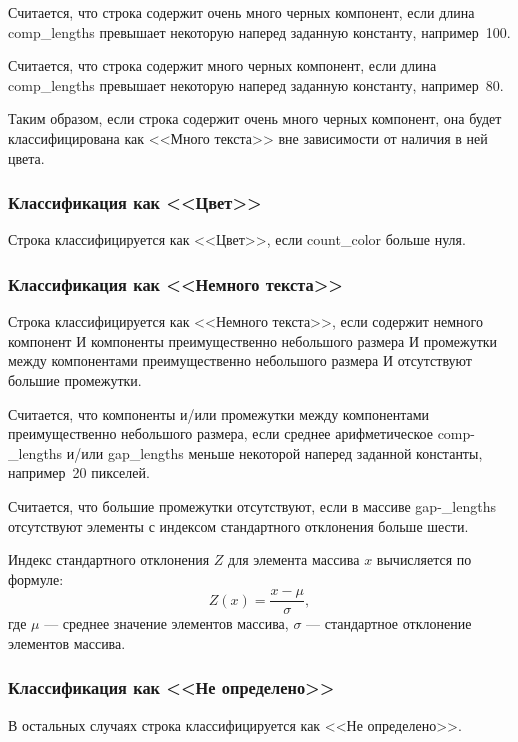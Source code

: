 Считается, что строка содержит очень много черных компонент, если длина comp\_lengths превышает некоторую наперед заданную константу, например~100.

Считается, что строка содержит много черных компонент, если длина comp\_lengths превышает некоторую наперед заданную константу, например~80.

Таким образом, если строка содержит очень много черных компонент, она будет классифицирована как <<Много текста>> вне зависимости от наличия в ней цвета.

\subsubsection*{Классификация как <<Цвет>>}

Строка классифицируется как <<Цвет>>, если count\_color больше нуля.

\subsubsection*{Классификация как <<Немного текста>>}

Строка классифицируется как <<Немного текста>>, если содержит немного компонент И компоненты преимущественно небольшого размера И промежутки между компонентами преимущественно небольшого размера И отсутствуют большие промежутки.

Считается, что компоненты и/или промежутки между компонентами преимущественно небольшого размера, если среднее арифметическое comp-\_lengths и/или gap\_lengths меньше некоторой наперед заданной константы, например~20 пикселей.

Считается, что большие промежутки отсутствуют, если в массиве gap-\_lengths отсутствуют элементы с индексом стандартного отклонения больше шести.

Индекс стандартного отклонения $Z$ для элемента массива $x$ вычисляется по формуле:
\begin{equation}
    Z(x) = \frac{x - \mu}{\sigma},
    \label{eq:z}
\end{equation}
где $\mu$ --- среднее значение элементов массива, $\sigma$ --- стандартное отклонение элементов массива.

\subsubsection*{Классификация как <<Не определено>>}

В остальных случаях строка классифицируется как <<Не определено>>.

